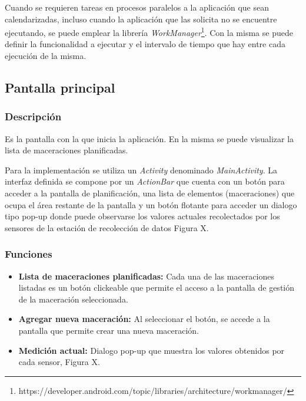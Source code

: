 \begin{itemize}
        \par Cuando se requieren tareas en procesos paralelos a la aplicación que sean calendarizadas, incluso cuando la aplicación que las solicita no se encuentre ejecutando, se puede emplear la librería \textit{WorkManager}\footnote{https://developer.android.com/topic/libraries/architecture/workmanager/}. Con la misma se puede definir la funcionalidad a ejecutar y el intervalo de tiempo que hay entre cada ejecución de la misma.
        
     \end{itemize}
    
    \subsection{Pantalla principal}
        \label{DescripPantallaPrincipal}
        
            \subsubsection{Descripción}
                \par Es la pantalla con la que inicia la aplicación. En la misma se puede visualizar la lista de maceraciones planificadas.
                
                \par Para la implementación se utiliza un \textit{Activity} denominado \textit{MainActivity}. La interfaz definida se compone por un \textit{ActionBar} que cuenta con un botón para acceder a la pantalla de planificación, una lista de elementos (maceraciones) que ocupa el área restante de la pantalla y un botón flotante para acceder un dialogo tipo pop-up donde puede observarse los valores actuales recolectados por los sensores de la estación de recolección de datos Figura X. 
                
            \subsubsection{Funciones}
                \begin{itemize}
                    \item \textbf{Lista de maceraciones planificadas:} Cada una de las maceraciones listadas es un botón clickeable que permite el acceso a la pantalla de gestión de la maceración seleccionada.
                    
                    \item \textbf{Agregar nueva maceración:} Al seleccionar el botón, se accede a la pantalla que permite crear una nueva maceración.
                    
                    \item \textbf{Medición actual:} Dialogo pop-up que muestra los valores obtenidos por cada sensor, Figura X.
                \end{itemize}
                
